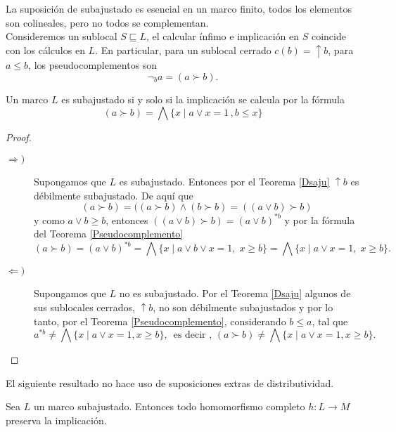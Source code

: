 La suposición de subajustado es esencial en un marco finito, todos los elementos son colineales, pero no todos se complementan.\\

Consideremos un sublocal $S\sqsubseteq L$, el calcular ínfimo e implicación en $S$ coincide con los cálculos en $L$. En particular, para un sublocal cerrado $c(b)=\uparrow b$, para $a\leq b$, los pseudocomplementos son 
\[
\neg_b a=(a\succ b).
\]

\begin{thm}\label{Fimplicación}
    Un marco $L$ es subajustado si y solo si la implicación se calcula por la fórmula 
    \[
    (a\succ b)=\bigwedge\{x\mid a\vee x=1\, ,b\leq x\}
    \]
\end{thm}

\begin{proof}
    \begin{description}
        \item[$\Rightarrow )$] Supongamos que $L$ es subajustado. Entonces por el Teorema \ref{Dsaju} $\uparrow b$ es débilmente subajustado. De aquí que 
        \[
        (a\succ b)=((a\succ b)\wedge (b\succ b)=((a\vee b)\succ b)
        \]
        y como $a\vee b\geq b$, entonces $((a\vee b)\succ b)=(a\vee b)^{*b}$ y por la fórmula del Teorema \ref{Pseudocomplemento}
        \[
        (a\succ b)=(a\vee b)^{*b}=\bigwedge\{x\mid a\vee b\vee x=1,\; x\geq b\}=\bigwedge\{x\mid a\vee x=1,\; x\geq b\}.
        \]
        \item[$\Leftarrow )$] Supongamos que $L$ no es subajustado. Por el Teorema \ref{Dsaju} algunos de sus sublocales cerrados, $\uparrow b$, no son débilmente subajustados y por lo tanto, por el Teorema \ref{Pseudocomplemento}, considerando $b\leq a$, tal que 
        \[
        a^{*b}\neq \bigwedge\{x\mid a\vee x=1, x\geq b\},\,\mbox{ es decir },\,(a\succ b)\neq \bigwedge\{x\mid a\vee x=1, x\geq b\}.
        \]
    \end{description}
\end{proof}

El siguiente resultado no hace uso de suposiciones extras de distributividad.

\begin{thm}
    Sea $L$ un marco subajustado. Entonces todo homomorfismo completo $h\colon L\to M$ preserva la implicación.
\end{thm}

